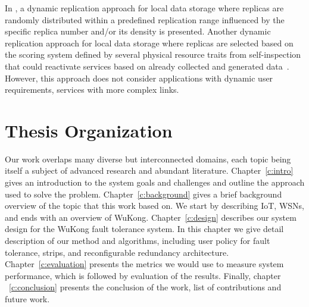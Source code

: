 In \cite{Piotrowski2009}, a dynamic replication approach for local data storage
where replicas are randomly distributed within a predefined replication range
influenced by the specific replica number and/or its density is presented. 
Another dynamic replication approach for local data storage where replicas are
selected based on the scoring system defined by several physical resource traits
from self-inspection that could reactivate services based on already collected
and generated data~\cite{Neumann2010}. However, this approach does not consider
applications with dynamic user requirements, services with more complex links.

\section{Thesis Organization}

Our work overlaps many diverse but interconnected domains, each topic being
itself a subject of advanced research and abundant literature.
Chapter~\ref{c:intro} gives an introduction to the system goals and challenges
and outline the approach used to solve the problem. Chapter~\ref{c:background}
gives a brief background overview of the topic that this work based on.  We
start by describing IoT, WSNs, and ends with an overview of WuKong.
Chapter~\ref{c:design} describes our system design for the WuKong fault
tolerance system. In this chapter we give detail description of our method and
algorithms, including user policy for fault tolerance, strips, and
reconfigurable redundancy architecture.  Chapter~\ref{c:evaluation} presents the
metrics we would use to measure system performance, which is followed by
evaluation of the results. Finally, chapter ~\ref{c:conclusion} presents the
conclusion of the work, list of contributions and future work.
